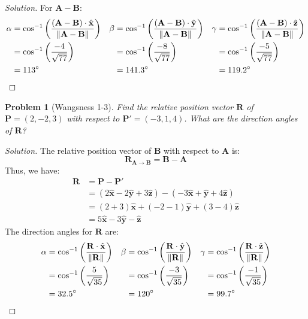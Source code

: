 \documentclass{article}
\theoremstyle{mystyle}
\newtheorem{problem}{Problem}[section]
\begin{document}
\begin{proof}[Solution]
For $\mathbf{A}-\mathbf{B}$:
\begin{align*}
    \alpha &=\cos^{-1}\bigg(\frac{(\mathbf{A}-\mathbf{B})\cdot\hat{\mathbf{x}}}{\norm{\mathbf{A-B}}}\bigg)&\beta &= \cos^{-1}\bigg(\frac{(\mathbf{A}-\mathbf{B})\cdot\hat{\mathbf{y}}}{\norm{\mathbf{A}-\mathbf{B}}}\bigg) &\gamma&= \cos^{-1}\bigg(\frac{(\mathbf{A}-\mathbf{B})\cdot\hat{\mathbf{z}}}{\norm{\mathbf{A}-\mathbf{B}}}\bigg)\\
    &=\cos^{-1}\bigg(\frac{-4}{\sqrt{77}}\bigg) & &=\cos^{-1}\bigg(\frac{-8}{\sqrt{77}}\bigg) & &=\cos^{-1}\bigg(\frac{-5}{\sqrt{77}}\bigg)\\
    &=113^{\circ} & &=141.3^{\circ} & &=119.2^{\circ}
\end{align*}
\end{proof}
\begin{problem}[Wangsness 1-3]
Find the relative position vector $\mathbf{R}$ of $\mathbf{P}=(2,-2,3)$ with respect to $\mathbf{P}' = (-3,1,4)$. What are the direction angles of $\mathbf{R}$?
\end{problem}
\begin{proof}[Solution]
The relative position vector of $\mathbf{B}$ with respect to $\mathbf{A}$ is:
\begin{equation*}
    \mathbf{R}_{\mathbf{A}\rightarrow \mathbf{B}} = \mathbf{B} -\mathbf{A}
\end{equation*}
Thus, we have:
\begin{align*}
    \mathbf{R} &=\mathbf{P}-\mathbf{P}'\\
    &= (2\hat{\mathbf{x}}-2\hat{\mathbf{y}}+3\hat{\mathbf{z}}) - (-3\hat{\mathbf{x}}+\hat{\mathbf{y}}+4\hat{\mathbf{z}})\\
    &= (2+3)\hat{\mathbf{x}}+(-2-1)\hat{\mathbf{y}}+(3-4)\hat{\mathbf{z}}\\
    &= 5\hat{\mathbf{x}}-3\hat{\mathbf{y}}-\hat{\mathbf{z}}
\end{align*}
The direction angles for $\mathbf{R}$ are:
\begin{align*}
    \alpha &=\cos^{-1}\bigg(\frac{\mathbf{R}\cdot\hat{\mathbf{x}}}{\norm{\mathbf{R}}}\bigg) &\beta&=\cos^{-1}\bigg(\frac{\mathbf{R}\cdot \hat{\mathbf{y}}}{\norm{\mathbf{R}}}\bigg) &\gamma&=\cos^{-1}\bigg(\frac{\mathbf{R}\cdot\hat{\mathbf{z}}}{\norm{\mathbf{R}}}\bigg)\\
    &=\cos^{-1}\bigg(\frac{5}{\sqrt{35}}\bigg) & &=\cos^{-1}\bigg(\frac{-3}{\sqrt{35}}\bigg) & &=\cos^{-1}\bigg(\frac{-1}{\sqrt{35}}\bigg)\\
    &= 32.5^{\circ} & &= 120^{\circ} & &=99.7^{\circ}
\end{align*}
\end{proof}
\end{document}
